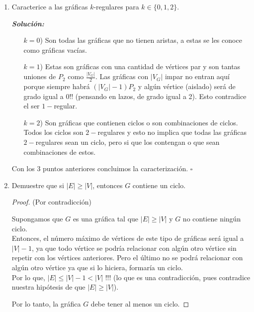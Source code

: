 \documentclass{article}
\begin{document}
\begin{enumerate}
\begin{proof}
        Por lo tanto, se sigue que si $a$ esta en $T_{1}$ entonces está en $T_{2}$.
      \end{proof}

    \item Caracterice a las gr\'aficas $k$-regulares para $k \in \{ 0, 1, 2 \}$.

      \textit{\textbf{Soluci\'on:}}
      \begin{itemize}
        \item[$k = 0$)] Son todas las gráficas que no tienen aristas, a estas se les conoce
          como gr\'aficas vac\'ias.

        \item[$k = 1$)] Estas son gr\'aficas con una cantidad de v\'ertices par y son tantas
          uniones de $P_2$ como $\frac{|V_G|}{2}$. Las gráficas con $|V_G|$ impar no entran
          aqu\'i porque siempre habr\'a $(|V_G| - 1) P_2$ y alg\'un v\'ertice (aislado) será
          de grado igual a $0$!! (pensando en lazos, de grado igual a 2). Esto contradice
          el ser $1-$regular.

        \item[$k = 2$)] Son gr\'aficas que contienen ciclos o son combinaciones de ciclos.
          Todos los ciclos son $2-$regulares y esto no implica que todas las gr\'aficas
          $2-$regulares sean un ciclo, pero si que los contengan o que sean combinaciones
          de estos.
      \end{itemize}
      Con los $3$ puntos anteriores concluimos la caracterización. \hfill $\square$

    \item Demuestre que si $|E| \ge |V|$, entonces $G$ contiene un ciclo.

      \renewcommand\qedsymbol{QED}
      \begin{proof} (Por contradicción)

        Supongamos que $G$ es una gráfica tal que $|E|\geq|V|$ y $G$ no contiene ningún ciclo. \\
        Entonces, el número máximo de vértices de este tipo de gráficas será igual a $|V|-1$, ya que
        todo vértice se podría relacionar con algún otro vértice sin repetir con los vértices anteriores.
        Pero el último no se podrá relacionar con algún otro vértice ya que si lo hiciera, formaría
        un ciclo. \\
        Por lo que, $|E|\leq|V|-1 < |V|$ !!! (lo que es una contradicción, pues contradice nuestra hipótesis
        de que $|E|\geq|V|$).

        Por lo tanto, la gráfica $G$ debe tener al menos un ciclo.
        \end{proof}
  \end{enumerate}
\end{document}
